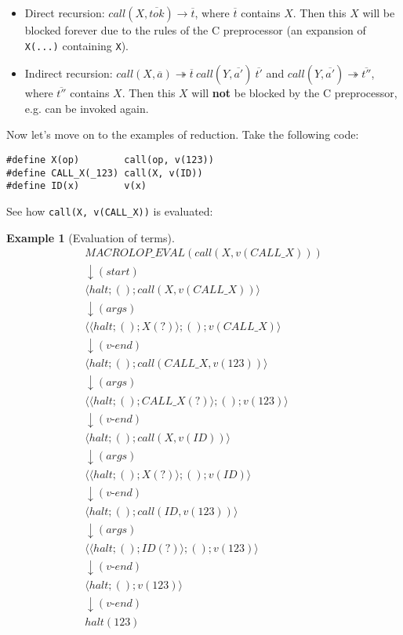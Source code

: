 \documentclass[12pt]{article}
\theoremstyle{break}
\newtheorem{example}{Example}
\begin{document}
\begin{itemize}
    \item Direct recursion: $call(X, \overline{tok}) \to \overline{t}$, where
    $\overline{t}$ contains $X$. Then this $X$ will be blocked forever due to the
    rules of the C preprocessor (an expansion of \texttt{X(...)} containing
    \texttt{X}).

    \item Indirect recursion: $call(X, \overline{a}) \twoheadrightarrow
    \overline{t} \ call(Y, \overline{a'}) \ \overline{t'}$ and
    $call(Y, \overline{a'}) \twoheadrightarrow \overline{t''}$, where $\overline{t''}$
    contains $X$. Then this $X$ will \textbf{not} be blocked by the C preprocessor,
    e.g. can be invoked again.
\end{itemize}

Now let's move on to the examples of reduction. Take the following code:

\begin{verbatim}
#define X(op)        call(op, v(123))
#define CALL_X(_123) call(X, v(ID))
#define ID(x)        v(x)
\end{verbatim}

See how \texttt{call(X, v(CALL\_X))} is evaluated:

\begin{example}[Evaluation of terms]
\small
\begin{gather*}
    MACROLOP\_EVAL(call(X, v(CALL\_X))) \\
    \downarrow (start) \\
    \langle halt; (); call(X, v(CALL\_X)) \rangle \\
    \downarrow (args) \\
    \langle \langle halt; (); X(?) \rangle; (); v(CALL\_X) \rangle \\
    \downarrow (v\mbox{-}end) \\
    \langle halt; (); call(CALL\_X, v(123)) \rangle \\
    \downarrow (args) \\
    \langle \langle halt; (); CALL\_X(?) \rangle; (); v(123) \rangle \\
    \downarrow (v\mbox{-}end) \\
    \langle halt; (); call(X, v(ID)) \rangle \\
    \downarrow (args) \\
    \langle \langle halt; (); X(?) \rangle; (); v(ID) \rangle \\
    \downarrow (v\mbox{-}end) \\
    \langle halt; (); call(ID, v(123)) \rangle \\
    \downarrow (args) \\
    \langle \langle halt; (); ID(?) \rangle; (); v(123) \rangle \\
    \downarrow (v\mbox{-}end) \\
    \langle halt; (); v(123) \rangle \\
    \downarrow (v\mbox{-}end) \\
    halt(123)
\end{gather*}
\normalsize
\end{example}
\end{document}
